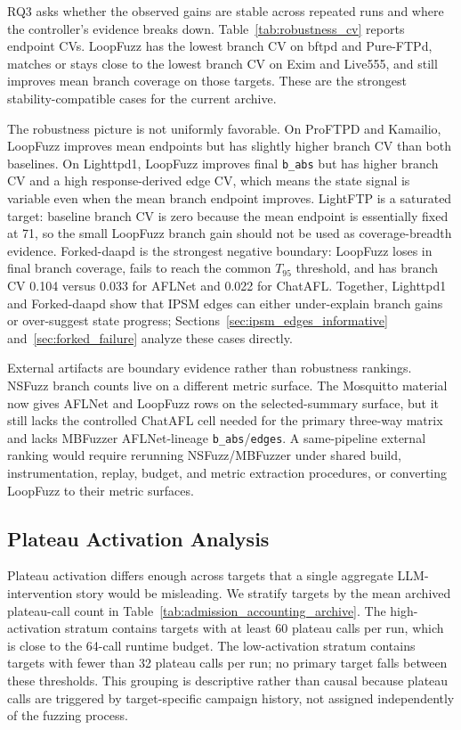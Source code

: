 \documentclass[final,5p,times,number]{elsarticle}
\begin{document}
RQ3 asks whether the observed gains are stable across repeated runs and where the controller's evidence breaks down. Table~\ref{tab:robustness_cv} reports endpoint CVs. LoopFuzz has the lowest branch CV on bftpd and Pure-FTPd, matches or stays close to the lowest branch CV on Exim and Live555, and still improves mean branch coverage on those targets. These are the strongest stability-compatible cases for the current archive.

The robustness picture is not uniformly favorable. On ProFTPD and Kamailio, LoopFuzz improves mean endpoints but has slightly higher branch CV than both baselines. On Lighttpd1, LoopFuzz improves final \texttt{b\_abs} but has higher branch CV and a high response-derived edge CV, which means the state signal is variable even when the mean branch endpoint improves. LightFTP is a saturated target: baseline branch CV is zero because the mean endpoint is essentially fixed at 71, so the small LoopFuzz branch gain should not be used as coverage-breadth evidence. Forked-daapd is the strongest negative boundary: LoopFuzz loses in final branch coverage, fails to reach the common $T_{95}$ threshold, and has branch CV 0.104 versus 0.033 for AFLNet and 0.022 for ChatAFL. Together, Lighttpd1 and Forked-daapd show that IPSM edges can either under-explain branch gains or over-suggest state progress; Sections~\ref{sec:ipsm_edges_informative} and~\ref{sec:forked_failure} analyze these cases directly.

External artifacts are boundary evidence rather than robustness rankings. NSFuzz branch counts live on a different metric surface. The Mosquitto material now gives AFLNet and LoopFuzz rows on the selected-summary surface, but it still lacks the controlled ChatAFL cell needed for the primary three-way matrix and lacks MBFuzzer AFLNet-lineage \texttt{b\_abs}/\texttt{edges}. A same-pipeline external ranking would require rerunning NSFuzz/MBFuzzer under shared build, instrumentation, replay, budget, and metric extraction procedures, or converting LoopFuzz to their metric surfaces.

\subsection{Plateau Activation Analysis}
\label{sec:plateau_activation_analysis}

Plateau activation differs enough across targets that a single aggregate LLM-intervention story would be misleading. We stratify targets by the mean archived plateau-call count in Table~\ref{tab:admission_accounting_archive}. The high-activation stratum contains targets with at least 60 plateau calls per run, which is close to the 64-call runtime budget. The low-activation stratum contains targets with fewer than 32 plateau calls per run; no primary target falls between these thresholds. This grouping is descriptive rather than causal because plateau calls are triggered by target-specific campaign history, not assigned independently of the fuzzing process.
\end{document}

